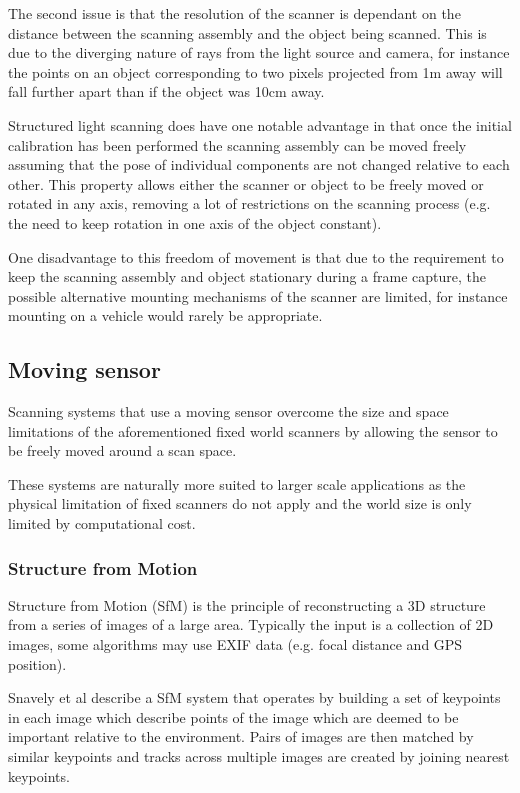 \documentclass{entcs}
\begin{document}
The second issue is that the resolution of the scanner is dependant on the
distance between the scanning assembly and the object being scanned. This is due
to the diverging nature of rays from the light source and camera, for instance
the points on an object corresponding to two pixels projected from 1m away will
fall further apart than if the object was 10cm away.

Structured light scanning does have one notable advantage in that once the
initial calibration has been performed the scanning assembly can be moved freely
assuming that the pose of individual components are not changed relative to each
other. This property allows either the scanner or object to be freely moved or
rotated in any axis, removing a lot of restrictions on the scanning process
(e.g. the need to keep rotation in one axis of the object constant).

One disadvantage to this freedom of movement is that due to the requirement to
keep the scanning assembly and object stationary during a frame capture, the
possible alternative mounting mechanisms of the scanner are limited, for
instance mounting on a vehicle would rarely be appropriate.

\subsection{Moving sensor}

Scanning systems that use a moving sensor overcome the size and space
limitations of the aforementioned fixed world scanners by allowing the sensor to
be freely moved around a scan space.

These systems are naturally more suited to larger scale applications as the
physical limitation of fixed scanners do not apply and the world size is only
limited by computational cost.

\subsubsection{Structure from Motion}

Structure from Motion (SfM) is the principle of reconstructing a 3D structure
from a series of images of a large area. Typically the input is a collection of
2D images, some algorithms may use EXIF data (e.g. focal distance and GPS
position).

Snavely et al \cite{Snavely2006} describe a SfM system that operates by building
a set of keypoints in each image which describe points of the image which are
deemed to be important relative to the environment. Pairs of images are then
matched by similar keypoints and tracks across multiple images are created by
joining nearest keypoints.
\end{document}
